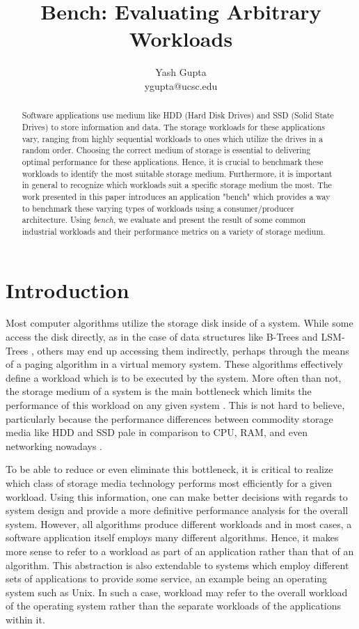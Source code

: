 \documentclass[10pt, author, twocolumn]{article}
\title{\vspace{-0ex}Bench: Evaluating Arbitrary Workloads}
\author{Yash Gupta \\
ygupta@ucsc.edu}
\date{\vspace{-3ex}}
\begin{document}
\maketitle
	
\begin{abstract}
Software applications use medium like HDD (Hard Disk Drives) and SSD (Solid State Drives) to store information and data. The storage workloads for these applications vary, ranging from highly sequential workloads to ones which utilize the drives in a random order. Choosing the correct medium of storage is essential to delivering optimal performance for these applications. Hence, it is crucial to benchmark these workloads to identify the most suitable storage medium. Furthermore, it is important in general to recognize which workloads suit a specific storage medium the most. The work presented in this paper introduces an application "bench" which provides a way to benchmark these varying types of workloads using a consumer/producer architecture. Using \textit{bench}, we evaluate and present the result of some common industrial workloads and their performance metrics on a variety of storage medium.
\end{abstract}

\section{Introduction}
Most computer algorithms utilize the storage disk inside of a system. While some access the disk directly, as in the case of data structures like B-Trees and LSM-Trees \cite{o1996log}, others may end up accessing them indirectly, perhaps through the means of a paging algorithm in a virtual memory system. These algorithms effectively define a workload which is to be executed by the system. More often than not, the storage medium of a system is the main bottleneck which limits the performance of this workload on any given system \cite{smith1985disk}. This is not hard to believe, particularly because the performance differences between commodity storage media like HDD and SSD pale in comparison to CPU, RAM, and even networking nowadays \cite{boden1995myrinet}.

To be able to reduce or even eliminate this bottleneck, it is critical to realize which class of storage media technology performs most efficiently for a given workload. Using this information, one can make better decisions with regards to system design and provide a more definitive performance analysis for the overall system. However, all algorithms produce different workloads and in most cases, a software application itself employs many different algorithms. Hence, it makes more sense to refer to a workload as part of an application rather than that of an algorithm. This abstraction is also extendable to systems which employ different sets of applications to provide some service, an example being an operating system such as Unix. In such a case, workload may refer to the overall workload of the operating system rather than the separate workloads of the applications within it.
\end{document}
